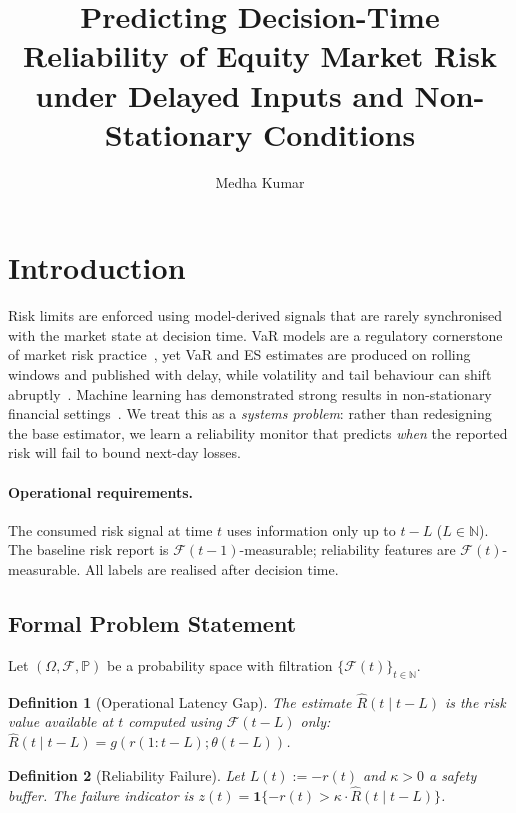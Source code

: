 \documentclass[sigconf]{acmart}
\title{Predicting Decision-Time Reliability of Equity Market Risk under Delayed Inputs and Non-Stationary Conditions}
\author{Medha Kumar}
\affiliation{%
  \institution{National Institute of Technology Surat}
  \city{Surat}
  \state{Gujarat}
  \country{India}
}
\newtheorem{definition}{Definition}
\begin{document}
\maketitle

\section{Introduction}

Risk limits are enforced using model-derived signals that are rarely
synchronised with the market state at decision time. VaR models are a 
regulatory cornerstone of market risk practice~\cite{basel2019}, yet VaR 
and ES estimates are produced on rolling windows and published with delay, 
while volatility and tail behaviour can shift abruptly~\cite{cont2001empirical}.
Machine learning has demonstrated strong results in non-stationary financial 
settings~\cite{dixon2020machine}. We treat this as a \emph{systems problem}: 
rather than redesigning the base estimator, we learn a reliability monitor 
that predicts \emph{when} the reported risk will fail to bound next-day losses.

\paragraph{Operational requirements.}
The consumed risk signal at time $t$ uses information only up to $t-L$
($L\in\mathbb{N}$). The baseline risk report is
$\mathcal{F}(t-1)$-measurable; reliability features are
$\mathcal{F}(t)$-measurable. All labels are realised after decision
time.

\subsection{Formal Problem Statement}

Let $(\Omega,\mathcal{F},\mathbb{P})$ be a probability space with
filtration $\{\mathcal{F}(t)\}_{t\in\mathbb{N}}$.

\begin{definition}[Operational Latency Gap]
The estimate $\hat{R}(t\mid t{-}L)$ is the risk value available at $t$
computed using $\mathcal{F}(t{-}L)$ only:
$\hat{R}(t\mid t{-}L)=g(r(1\!:\!t{-}L);\theta(t{-}L))$.
\end{definition}

\begin{definition}[Reliability Failure]
Let $L(t){:=}{-}r(t)$ and $\kappa{>}0$ a safety buffer. The failure
indicator is $z(t)=\mathbf{1}\{-r(t)>\kappa\cdot\hat{R}(t\mid t{-}L)\}$.
\end{definition}
\end{document}
